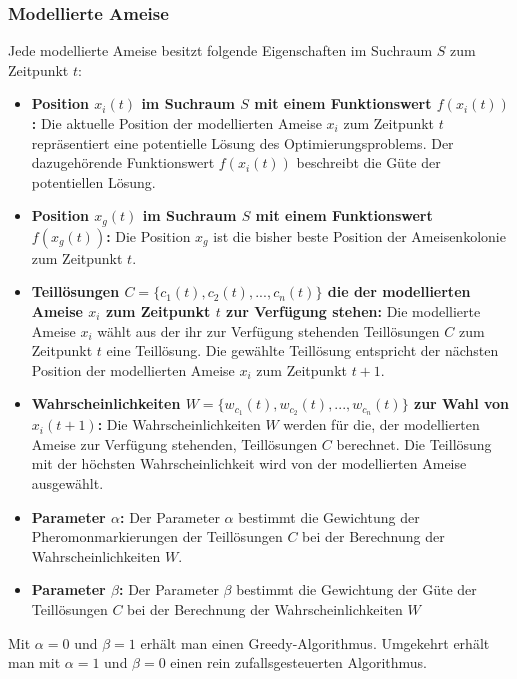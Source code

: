 \documentclass[a4paper, 11pt]{article}
\begin{document}
\subsubsection{Modellierte Ameise}
Jede modellierte Ameise besitzt folgende Eigenschaften im Suchraum $S$ zum Zeitpunkt $t$:
\begin{itemize}
	\item \textbf{Position $x_{i}(t)$ im Suchraum $S$ mit einem Funktionswert $f(x_{i}(t))$:} Die aktuelle Position der modellierten Ameise $x_{i}$ zum Zeitpunkt $t$ repräsentiert eine potentielle Lösung des Optimierungsproblems. Der dazugehörende Funktionswert $f(x_{i}(t))$ beschreibt die Güte der potentiellen Lösung.
	\item \textbf{Position $x_{g}(t)$ im Suchraum $S$ mit einem Funktionswert $f(x_{g}(t))$:} Die Position $x_{g}$ ist die bisher beste Position der Ameisenkolonie zum Zeitpunkt $t$.
	\item \textbf{Teillösungen $C=\{c_{1}(t),c_{2}(t),...,c_{n}(t)\}$ die der modellierten Ameise $x_{i}$ zum Zeitpunkt $t$ zur Verfügung stehen:} Die modellierte Ameise $x_{i}$ wählt aus der ihr zur Verfügung stehenden Teillösungen $C$ zum Zeitpunkt $t$ eine Teillösung. Die gewählte Teillösung entspricht der nächsten Position der modellierten Ameise $x_{i}$ zum Zeitpunkt $t+1$.
	\item \textbf{Wahrscheinlichkeiten $W=\{w_{c_{1}}(t),w_{c_{2}}(t),...,w_{c_{n}}(t)\}$  zur Wahl von $x_{i}(t+1)$:} Die Wahrscheinlichkeiten $W$ werden für die, der modellierten Ameise zur Verfügung stehenden, Teillösungen $C$ berechnet. Die Teillösung mit der höchsten Wahrscheinlichkeit wird von der modellierten Ameise ausgewählt.  	
	\item \textbf{Parameter $\alpha$:} Der Parameter $\alpha$ bestimmt die Gewichtung der Pheromonmarkierungen der Teillösungen $C$ bei der Berechnung der Wahrscheinlichkeiten $W$.
	\item \textbf{Parameter $\beta$:} Der Parameter $\beta$ bestimmt die Gewichtung der Güte der Teillösungen $C$ bei der Berechnung der Wahrscheinlichkeiten $W$
\end{itemize}
Mit $\alpha = 0$ und $\beta = 1$ erhält man einen Greedy-Algorithmus. Umgekehrt erhält man mit $\alpha = 1$ und $\beta = 0$ einen rein zufallsgesteuerten Algorithmus.
\newpage
\end{document}
